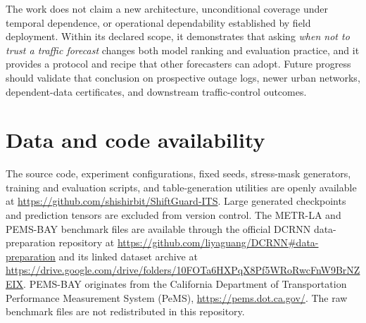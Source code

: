 \documentclass[preprint,12pt]{elsarticle}
\begin{document}
The work does not claim a new architecture, unconditional coverage under
temporal dependence, or operational dependability established by field
deployment. Within its declared scope, it demonstrates that asking \emph{when
not to trust a traffic forecast} changes both model ranking and evaluation
practice, and it provides a protocol and recipe that other forecasters can
adopt. Future progress should validate that conclusion on prospective outage
logs, newer urban networks, dependent-data certificates, and downstream
traffic-control outcomes.

\section*{Data and code availability}
The source code, experiment configurations, fixed seeds, stress-mask generators,
training and evaluation scripts, and table-generation utilities are openly
available at \url{https://github.com/shishirbit/ShiftGuard-ITS}. Large generated
checkpoints and prediction tensors are excluded from version control. The
METR-LA and PEMS-BAY benchmark files are available through the official DCRNN
data-preparation repository at \url{https://github.com/liyaguang/DCRNN#data-preparation}
and its linked dataset archive at
\url{https://drive.google.com/drive/folders/10FOTa6HXPqX8Pf5WRoRwcFnW9BrNZEIX}.
PEMS-BAY originates from the California Department of Transportation Performance
Measurement System (PeMS), \url{https://pems.dot.ca.gov/}. The raw benchmark
files are not redistributed in this repository.



\end{document}
